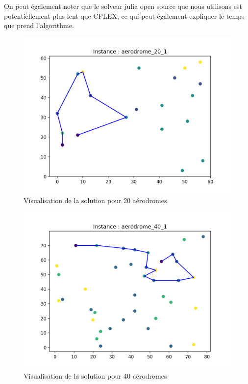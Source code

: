 \documentclass{article}
\begin{document}
On peut également noter que le solveur julia open source que nous utilisons est potentiellement plus lent que CPLEX, ce qui peut également expliquer le temps que prend l'algorithme.

\begin{figure}[!ht]
    \centering
    \includegraphics[scale=0.7]{20.png}
    \caption{Visualisation de la solution pour 20 aérodromes}
    \label{fig:20}
\end{figure}

\begin{figure}[!ht]
    \centering
    \includegraphics[scale=0.7]{40.png}
    \caption{Visualisation de la solution pour 40 aérodromes}
    \label{fig:20}
\end{figure}
\end{document}
